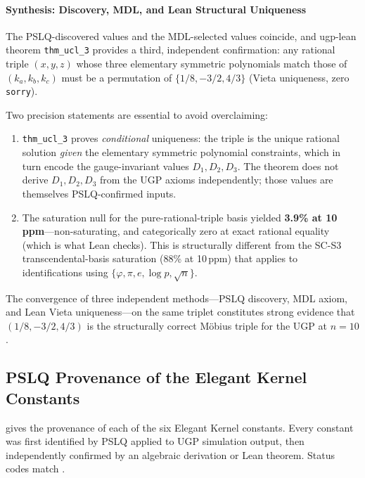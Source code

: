 \documentclass[11pt,twocolumn]{article}
\begin{document}
\paragraph{Synthesis: Discovery, MDL, and Lean Structural Uniqueness}
The PSLQ-discovered values and the MDL-selected values coincide, and ugp-lean theorem \texttt{thm\_ucl\_3} provides a third, independent confirmation: any rational triple $(x,y,z)$ whose three elementary symmetric polynomials match those of $(k_a, k_b, k_c)$ must be a permutation of $\{1/8, -3/2, 4/3\}$ (Vieta uniqueness, zero \texttt{sorry}).

Two precision statements are essential to avoid overclaiming:
\begin{enumerate}[label=(\roman*),itemsep=0.1em]
\item \texttt{thm\_ucl\_3} proves \emph{conditional} uniqueness: the triple is the unique rational solution \emph{given} the elementary symmetric polynomial constraints, which in turn encode the gauge-invariant values $D_1, D_2, D_3$. The theorem does not derive $D_1, D_2, D_3$ from the UGP axioms independently; those values are themselves PSLQ-confirmed inputs.
\item The saturation null for the pure-rational-triple basis yielded \textbf{3.9\% at 10\,ppm}—non-saturating, and categorically zero at exact rational equality (which is what Lean checks). This is structurally different from the SC-S3 transcendental-basis saturation (88\% at 10\,ppm) that applies to identifications using $\{\varphi, \pi, e, \log p, \sqrt{n}\}$.
\end{enumerate}
The convergence of three independent methods—PSLQ discovery, MDL axiom, and Lean Vieta uniqueness—on the same triplet constitutes strong evidence that $(1/8, -3/2, 4/3)$ is the structurally correct Möbius triple for the UGP at $n=10$.

\subsection{PSLQ Provenance of the Elegant Kernel Constants}
\label{subsec:pslq_provenance}

 gives the provenance of each of the six Elegant Kernel constants. Every constant was first identified by PSLQ applied to UGP simulation output, then independently confirmed by an algebraic derivation or Lean theorem. Status codes match .
\end{document}
